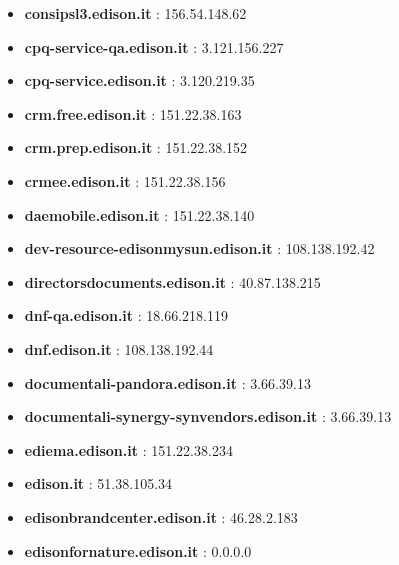 \documentclass{article}
\begin{document}
\begin{itemize}
            \item \textbf{ consipsl3.edison.it }: 156.54.148.62
        
            \item \textbf{ cpq-service-qa.edison.it }: 3.121.156.227
        
            \item \textbf{ cpq-service.edison.it }: 3.120.219.35
        
            \item \textbf{ crm.free.edison.it }: 151.22.38.163
        
            \item \textbf{ crm.prep.edison.it }: 151.22.38.152
        
            \item \textbf{ crmee.edison.it }: 151.22.38.156
        
            \item \textbf{ daemobile.edison.it }: 151.22.38.140
        
            \item \textbf{ dev-resource-edisonmysun.edison.it }: 108.138.192.42
        
            \item \textbf{ directorsdocuments.edison.it }: 40.87.138.215
        
            \item \textbf{ dnf-qa.edison.it }: 18.66.218.119
        
            \item \textbf{ dnf.edison.it }: 108.138.192.44
        
            \item \textbf{ documentali-pandora.edison.it }: 3.66.39.13
        
            \item \textbf{ documentali-synergy-synvendors.edison.it }: 3.66.39.13
        
            \item \textbf{ ediema.edison.it }: 151.22.38.234
        
            \item \textbf{ edison.it }: 51.38.105.34
        
            \item \textbf{ edisonbrandcenter.edison.it }: 46.28.2.183
        
            \item \textbf{ edisonfornature.edison.it }: 0.0.0.0
        

\end{itemize}
\end{document}
